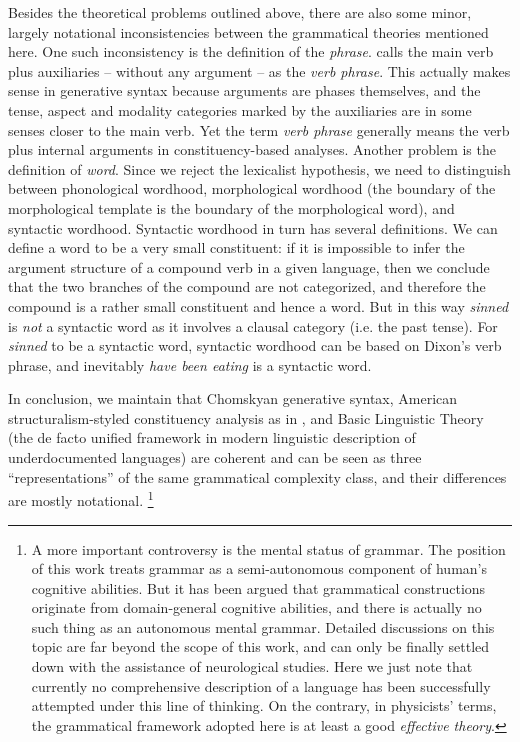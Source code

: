 \documentclass[UTF8, a4paper, oneside, scheme=plain, 12pt]{ctexrep}
\newcommand*{\term}[1]{\emph{#1}}
\newcommand{\form}[1]{\emph{#1}}
\begin{document}
{Besides the theoretical problems outlined above, there are also some minor, largely notational inconsistencies between the grammatical theories mentioned here.
One such inconsistency is the definition of the \term{phrase}.
\citet{dixon2009basic} calls the main verb plus auxiliaries -- without any argument -- as the \term{verb phrase}.
This actually makes sense in generative syntax because arguments are phases themselves,
and the tense, aspect and modality categories marked by the auxiliaries are in some senses closer to the main verb.
Yet the term \term{verb phrase} generally means the verb plus internal arguments in constituency-based analyses.
Another problem is the definition of \term{word}.
Since we reject the lexicalist hypothesis,
we need to distinguish between phonological wordhood,
morphological wordhood (the boundary of the morphological template is the boundary of the morphological word),
and syntactic wordhood.
Syntactic wordhood in turn has several definitions.
We can define a word to be a very small constituent:
if it is impossible to infer the argument structure of a compound verb in a given language,
then we conclude that the two branches of the compound are not categorized,
and therefore the compound is a rather small constituent and hence a word.
But in this way \form{sinned} is \emph{not} a syntactic word as it involves a clausal category (i.e. the past tense).
For \form{sinned} to be a syntactic word, syntactic wordhood can be based on Dixon's verb phrase,
and inevitably \form{have been eating} is a syntactic word.

In conclusion, we maintain that Chomskyan generative syntax,
American structuralism-styled constituency analysis as in \citet{cgel},
and Basic Linguistic Theory (the de facto unified framework in modern linguistic description of underdocumented languages) are coherent and can be seen as three ``representations'' of the same grammatical complexity class,
and their differences are mostly notational.%
\footnote{
    A more important controversy is the mental status of grammar.
    The position of this work treats grammar as a semi-autonomous component of human's cognitive abilities.
    But it has been argued that grammatical constructions originate from domain-general cognitive abilities, and there is actually no such thing as an autonomous mental grammar.
    Detailed discussions on this topic are far beyond the scope of this work,
    and can only be finally settled down with the assistance of neurological studies.
    Here we just note that currently no comprehensive description of a language has been successfully attempted under this line of thinking.
    On the contrary, in physicists' terms, the grammatical framework adopted here is at least a good \term{effective theory}.

}}
\end{document}
